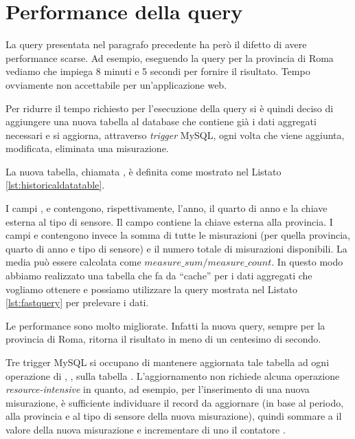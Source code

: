 \section{Performance della query}

La query presentata nel paragrafo precedente ha però il difetto di avere
performance scarse. Ad esempio, eseguendo la query per la provincia di Roma
vediamo che impiega 8 minuti e 5 secondi per fornire il risultato. Tempo
ovviamente non accettabile per un'applicazione web.

Per ridurre il tempo richiesto per l'esecuzione della query si è quindi deciso
di aggiungere una nuova tabella al database che contiene già i dati aggregati
necessari e si aggiorna, attraverso \textit{trigger} MySQL, ogni volta che viene
aggiunta, modificata, eliminata una misurazione.

La nuova tabella, chiamata , è definita come mostrato nel
Listato \ref{lst:historicaldatatable}.



I campi ,  e  contengono,
rispettivamente, l'anno, il quarto di anno e la chiave esterna al tipo di
sensore. Il campo  contiene la chiave esterna alla provincia. I
campi  e  contengono invece la somma di
tutte le misurazioni (per quella provincia, quarto di anno e tipo di sensore) e
il numero totale di misurazioni disponibili.  La media può essere calcolata come
\(measure\_sum / measure\_count\). In questo modo abbiamo realizzato una tabella
che fa da ``cache'' per i dati aggregati che vogliamo ottenere e possiamo
utilizzare la query mostrata nel Listato \ref{lst:fastquery} per prelevare i
dati.



Le performance sono molto migliorate. Infatti la nuova query, sempre per la
provincia di Roma, ritorna il risultato in meno di un centesimo di secondo.

Tre trigger MySQL si occupano di mantenere aggiornata tale tabella ad ogni
operazione di , ,  sulla tabella
. L'aggiornamento non richiede alcuna operazione
\textit{resource-intensive} in quanto, ad esempio, per l'inserimento di una nuova
misurazione, è sufficiente individuare il record da aggiornare (in base al
periodo, alla provincia e al tipo di sensore della nuova misurazione), quindi
sommare a  il valore della nuova misurazione e incrementare
di uno il contatore .
